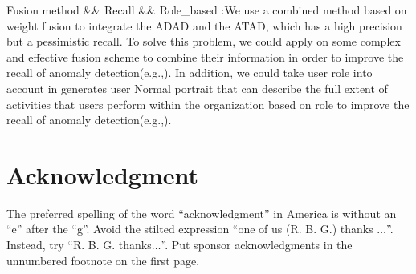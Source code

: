 \documentclass[conference]{IEEEtran}
\begin{document}
Fusion method \&\& Recall \&\& Role\_based	:We use a combined method based on weight fusion to integrate the ADAD and the ATAD, which has a high precision but a pessimistic recall. To solve this problem, we could apply on some complex and effective fusion scheme to combine their information in order to improve the recall of anomaly detection(e.g.,\cite{b49}).  In addition, we could take user role into account in generates user Normal portrait that can describe the full extent of activities that users perform within the organization based on role to improve the recall of anomaly detection(e.g.,\cite{b50}).   	


\section*{Acknowledgment}

The preferred spelling of the word ``acknowledgment'' in America is without 
an ``e'' after the ``g''. Avoid the stilted expression ``one of us (R. B. 
G.) thanks $\ldots$''. Instead, try ``R. B. G. thanks$\ldots$''. Put sponsor 
acknowledgments in the unnumbered footnote on the first page.
\end{document}
